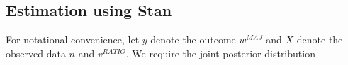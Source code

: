 %
%
%
%
%



\subsection{Estimation using Stan}

For notational convenience, let $y$ denote the outcome $w^{MAJ}$ and $X$ denote the observed data $n$ and $v^{RATIO}$. We require the joint posterior distribution

